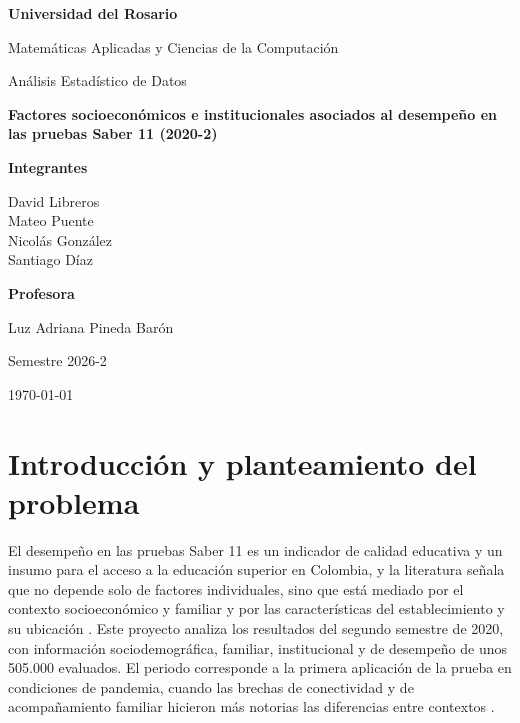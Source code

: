 \documentclass[12pt]{article}
\newcommand{\portadaUniversidad}{Universidad del Rosario}
\newcommand{\portadaPrograma}{Matemáticas Aplicadas y Ciencias de la Computación}
\newcommand{\portadaAsignatura}{Análisis Estadístico de Datos}
\newcommand{\portadaTitulo}{Factores socioeconómicos e institucionales asociados al desempeño en las pruebas Saber 11 (2020-2)}
\newcommand{\portadaIntegrantes}{%
  David Libreros\\
  Mateo Puente \\
  Nicolás González\\
  Santiago Díaz}
\newcommand{\portadaProfesora}{Luz Adriana Pineda Barón}
\newcommand{\portadaFecha}{\today}
\newcommand{\portadaSemestre}{Semestre 2026-2}
\begin{document}
\begin{titlepage}
  \thispagestyle{empty}
  \centering

  {\bfseries \portadaUniversidad\par}
  \vspace{0.6cm}
  {\portadaPrograma\par}
  \vspace{0.4cm}
  {\portadaAsignatura\par}

  \vfill

  {\bfseries \portadaTitulo\par}

  \vfill

  {
    \textbf{Integrantes}\par
    \vspace{0.3cm}
    \portadaIntegrantes\par
    \vspace{0.8cm}
    \textbf{Profesora}\par
    \vspace{0.3cm}
    \portadaProfesora\par
  }

  \vfill

  {
    \portadaSemestre\par
    \portadaFecha\par
  }
\end{titlepage}

\setcounter{page}{1}

\section{Introducción y planteamiento del problema}

El desempeño en las pruebas Saber 11 es un indicador de calidad educativa y un insumo para el
acceso a la educación superior en Colombia, y la literatura señala que no depende solo de factores
individuales, sino que está mediado por el contexto socioeconómico y familiar
\parencite{garciagil2021} y por las características del establecimiento y su ubicación
\parencite{quintero2025}. Este proyecto
analiza los resultados del segundo semestre de 2020, con información sociodemográfica, familiar,
institucional y de desempeño de unos 505.000 evaluados. El periodo corresponde a la primera
aplicación de la prueba en condiciones de pandemia, cuando las brechas de conectividad y de
acompañamiento familiar hicieron más notorias las diferencias entre contextos
\parencite{quintero2025}.
\end{document}

